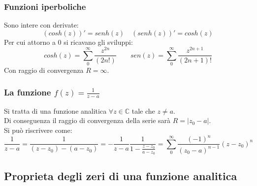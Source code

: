 \documentclass[twoside]{article}
\begin{document}
\subsubsection{Funzioni iperboliche}
Sono intere con derivate:
\begin{equation}
    (cosh(z))'=senh(z) \quad (senh(z))'=cosh(z)
\end{equation}
Per cui attorno a 0 si ricavano gli sviluppi:
\begin{equation}
    cosh(z)=\sum_0^\infty\frac{z^{2n}}{(2n!)}  \qquad
    sen(z)=\sum_0^\infty\frac{z^{2n+1}}{(2n+1)!}
\end{equation}
Con raggio di convergenza $R=\infty$.
\subsubsection{La funzione \texorpdfstring{$f(z)=\frac{1}{z-a}$}{Lg}}
Si tratta di una funzione analitica $\forall z \in\mathds{C}$ tale che $z\ne a$.\\
Di conseguenza il raggio di convergenza della serie sarà $R=|z_0-a|$.\\
Si può riscrivere come:
\begin{equation}
    \frac{1}{z-a}=\frac{1}{(z-z_0)-(a-z_0)}=-\frac{1}{z-a}\frac{1}{1-\frac{z-z_0}{a-z_0}}=\sum_0^\infty\frac{(-1)^n}{(z_0-a)^{n-1}}(z-z_0)^n
\end{equation}

\subsection{Proprieta degli zeri di una funzione analitica}
\end{document}
